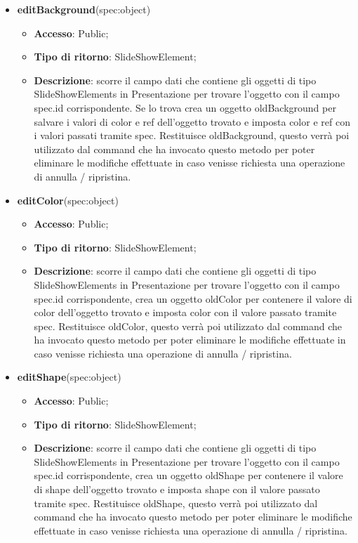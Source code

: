 {\begin{itemize}
\begin{itemize}
			\end{itemize}
			\item \textbf{editBackground}(spec:object)
			\begin{itemize}
				\item \textbf{Accesso}: Public;
				\item \textbf{Tipo di ritorno}: SlideShowElement;
				\item \textbf{Descrizione}: scorre il campo dati che contiene gli oggetti di tipo SlideShowElements in Presentazione per trovare l’oggetto con il campo spec.id corrispondente. Se lo trova crea un oggetto oldBackground per salvare i valori di color e ref dell’oggetto trovato e imposta color e ref con i valori passati tramite spec. Restituisce oldBackground, questo verrà poi utilizzato dal command che ha invocato questo metodo per poter eliminare le modifiche effettuate in caso venisse richiesta una operazione di annulla / ripristina.
			\end{itemize}
			\item \textbf{editColor}(spec:object)
			\begin{itemize}
				\item \textbf{Accesso}: Public;
				\item \textbf{Tipo di ritorno}: SlideShowElement;
				\item \textbf{Descrizione}: scorre il campo dati che contiene gli oggetti di tipo SlideShowElements in Presentazione per trovare l’oggetto con il campo spec.id corrispondente, crea un oggetto oldColor per contenere il valore di color dell’oggetto trovato e imposta color con il valore passato tramite spec. Restituisce oldColor, questo verrà poi utilizzato dal command che ha invocato questo metodo per poter eliminare le modifiche effettuate in caso venisse richiesta una operazione di annulla / ripristina.
			\end{itemize}
			\item \textbf{editShape}(spec:object)
			\begin{itemize}
				\item \textbf{Accesso}: Public;
				\item \textbf{Tipo di ritorno}: SlideShowElement;
				\item \textbf{Descrizione}: scorre il campo dati che contiene gli oggetti di tipo SlideShowElements in Presentazione per trovare l’oggetto con il campo spec.id corrispondente, crea un oggetto oldShape per contenere il valore di shape dell’oggetto trovato e imposta shape con il valore passato tramite spec. Restituisce oldShape, questo verrà poi utilizzato dal command che ha invocato questo metodo per poter eliminare le modifiche effettuate in caso venisse richiesta una operazione di annulla / ripristina.

\end{itemize}
\end{itemize}}
